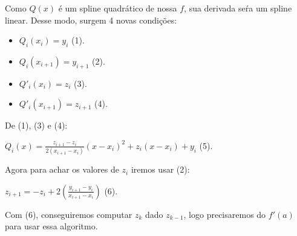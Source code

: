 \documentclass[12pt]{article}
\begin{document}
Como $Q(x)$ é um spline quadrático de nossa $f$, sua derivada seŕa um spline linear. Desse modo, surgem 4 novas condições:

\begin{itemize}
  
\item $Q_i(x_i) = y_i$ (1).
  
\item $Q_i(x_{i+1}) = y_{i+1}$ (2).
  
\item $Q'_i(x_i) = z_i$ (3).
  
\item $Q'_i(x_{i+1}) = z_{i+1}$ (4).
  
\end{itemize}

De (1), (3) e (4):

$Q_i(x) = \frac{z_{i+1}-z_{i}}{2(x_{i+1}-x_i)}(x-x_i)^2+z_i(x-x_i)+y_i$ (5).

Agora para achar os valores de $z_i$ iremos usar (2):

$z_{i+1} = -z_i + 2(\frac{y_{i+1}-y_i}{x_{i+1}-x_i})$ (6).

Com (6), conseguiremos computar $z_k$ dado $z_{k-1}$, logo precisaremos do $f'(a)$ para usar essa algoritmo.
\end{document}
